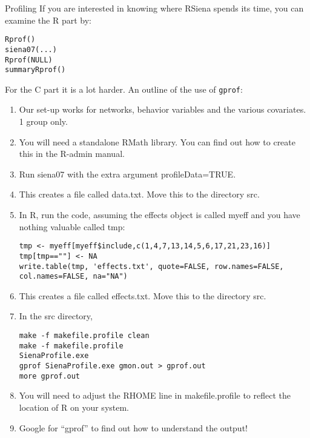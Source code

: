 \documentclass[12pt, a4paper]{article}
\makeatletter
\renewcommand{\=}{\,=\,}
\newcommand{\+}{\,+\,}
\renewcommand{\section}{\@startsection{section}{1}
                {0pt}{\baselineskip}{0.5\baselineskip}
                {\centering\sffamily} }
\makeatother
\begin{document}
\section{Profiling}
If you are interested in knowing where RSiena spends its time, you can examine
the R part by:
\begin{verbatim}
Rprof()
siena07(...)
Rprof(NULL)
summaryRprof()
\end{verbatim}
For the C part it is a lot harder. An outline of the use of \verb|gprof|:
\begin{enumerate}
\item Our set-up works for networks, behavior variables and the various
  covariates. 1 group only.
\item You will need a standalone RMath library. You can find out how to create
  this in the R-admin manual.
\item Run siena07 with the extra argument \textsf{profileData=TRUE}.
\item This creates a file called \textsf{data.txt}. Move this to the directory
  \textsf{src}.
\item In R, run the code, assuming the effects object is called \textsf{myeff}
  and you have nothing valuable called \textsf{tmp}:
\begin{verbatim}
tmp <- myeff[myeff$include,c(1,4,7,13,14,5,6,17,21,23,16)]
tmp[tmp==""] <- NA
write.table(tmp, 'effects.txt', quote=FALSE, row.names=FALSE,
col.names=FALSE, na="NA")
\end{verbatim}
\item This creates a file called \textsf{effects.txt}.  Move this to the
  directory \textsf{src}.
\item In the \textsf{src} directory,
\begin{verbatim}
make -f makefile.profile clean
make -f makefile.profile
SienaProfile.exe
gprof SienaProfile.exe gmon.out > gprof.out
more gprof.out
\end{verbatim}
\item You will need to adjust the \textsf{RHOME} line in
  \textsf{makefile.profile} to reflect the location of R on your system.
\item Google for ``gprof'' to find out how to understand the output!
\end{enumerate}
\end{document}
